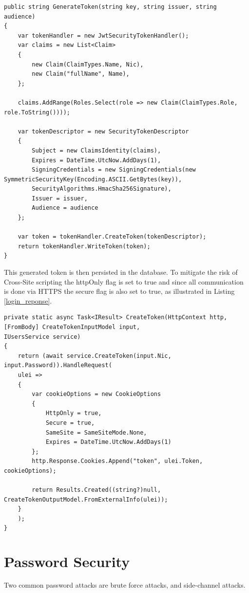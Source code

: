 \begin{lstlisting}[style=sharpc, caption={JWT creation}, label={jwt_creation}] 
public string GenerateToken(string key, string issuer, string audience)
{
	var tokenHandler = new JwtSecurityTokenHandler();
	var claims = new List<Claim>
	{
		new Claim(ClaimTypes.Name, Nic),
		new Claim("fullName", Name),
	};
	
	claims.AddRange(Roles.Select(role => new Claim(ClaimTypes.Role, role.ToString())));
	
	var tokenDescriptor = new SecurityTokenDescriptor
	{
		Subject = new ClaimsIdentity(claims),
		Expires = DateTime.UtcNow.AddDays(1),
		SigningCredentials = new SigningCredentials(new SymmetricSecurityKey(Encoding.ASCII.GetBytes(key)),
		SecurityAlgorithms.HmacSha256Signature),
		Issuer = issuer,
		Audience = audience
	};
	
	var token = tokenHandler.CreateToken(tokenDescriptor);
	return tokenHandler.WriteToken(token);
}
\end{lstlisting}

This generated token is then persisted in the database.
To mitigate the risk of Cross-Site scripting the httpOnly flag is set to true and since all communication is done via HTTPS the secure flag is also set to true, as illustrated in Listing \ref{login_reponse}.

\begin{lstlisting}[style=sharpc, caption={Login Reponse, note the HttpOnly and Secure flags are set to true.}, label={login_reponse}] 
private static async Task<IResult> CreateToken(HttpContext http, [FromBody] CreateTokenInputModel input,
IUsersService service)
{
	return (await service.CreateToken(input.Nic, input.Password)).HandleRequest(
	ulei =>
	{
		var cookieOptions = new CookieOptions
		{
			HttpOnly = true,
			Secure = true,
			SameSite = SameSiteMode.None,
			Expires = DateTime.UtcNow.AddDays(1)
		};
		http.Response.Cookies.Append("token", ulei.Token, cookieOptions);
		
		return Results.Created((string?)null, CreateTokenOutputModel.FromExternalInfo(ulei));
	}
	);
}
\end{lstlisting}

\section{Password Security}\label{sec:security}

Two common password attacks are brute force attacks, and side-channel attacks.

